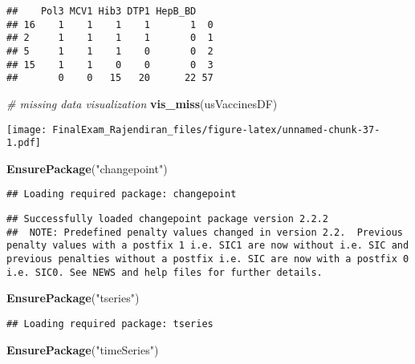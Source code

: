 \documentclass[]{article}
\newenvironment{Shaded}{\begin{snugshade}}{\end{snugshade}}
\newcommand{\CommentTok}[1]{\textcolor[rgb]{0.56,0.35,0.01}{\textit{#1}}}
\newcommand{\KeywordTok}[1]{\textcolor[rgb]{0.13,0.29,0.53}{\textbf{#1}}}
\newcommand{\NormalTok}[1]{#1}
\newcommand{\StringTok}[1]{\textcolor[rgb]{0.31,0.60,0.02}{#1}}
\begin{document}
\begin{verbatim}
##    Pol3 MCV1 Hib3 DTP1 HepB_BD   
## 16    1    1    1    1       1  0
## 2     1    1    1    1       0  1
## 5     1    1    1    0       0  2
## 15    1    1    0    0       0  3
##       0    0   15   20      22 57
\end{verbatim}

\begin{Shaded}
\begin{Highlighting}[]
\CommentTok{# missing data visualization}
\KeywordTok{vis_miss}\NormalTok{(usVaccinesDF)}
\end{Highlighting}
\end{Shaded}

\texttt{[image: FinalExam\_Rajendiran\_files/figure-latex/unnamed-chunk-37-1.pdf]}

\begin{Shaded}
\begin{Highlighting}[]
\KeywordTok{EnsurePackage}\NormalTok{(}\StringTok{"changepoint"}\NormalTok{)}
\end{Highlighting}
\end{Shaded}

\begin{verbatim}
## Loading required package: changepoint
\end{verbatim}

\begin{verbatim}
## Successfully loaded changepoint package version 2.2.2
##  NOTE: Predefined penalty values changed in version 2.2.  Previous penalty values with a postfix 1 i.e. SIC1 are now without i.e. SIC and previous penalties without a postfix i.e. SIC are now with a postfix 0 i.e. SIC0. See NEWS and help files for further details.
\end{verbatim}

\begin{Shaded}
\begin{Highlighting}[]
\KeywordTok{EnsurePackage}\NormalTok{(}\StringTok{"tseries"}\NormalTok{)}
\end{Highlighting}
\end{Shaded}

\begin{verbatim}
## Loading required package: tseries
\end{verbatim}

\begin{Shaded}
\begin{Highlighting}[]
\KeywordTok{EnsurePackage}\NormalTok{(}\StringTok{"timeSeries"}\NormalTok{)}
\end{Highlighting}
\end{Shaded}
\end{document}
